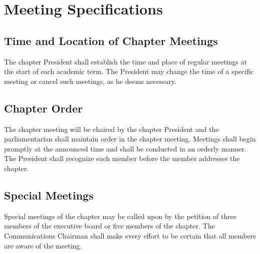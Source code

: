 \chapter{Meeting Specifications}
\label{cha:meeting-specifications}

\section{Time and Location of Chapter Meetings}
\label{sec:time-and-location-of-chapter-meetings}

The chapter President shall establish the time and place of regular meetings at
the start of each academic term.
The President may change the time of a specific
meeting or cancel such meetings, as he deems necessary.

\section{Chapter Order}
\label{sec:chapter-order}

The chapter meeting will be chaired by the chapter President and the
parliamentarian shall maintain order in the chapter meeting.
Meetings shall begin promptly at the announced time and shall be conducted in an
orderly manner.
The President shall recognize each member before the member addresses the
chapter.

\section{Special Meetings}
\label{sec:special-meetings-bylaws}

Special meetings of the chapter may be called upon by the petition of three
members of the executive board or five members of the chapter.
The Communications Chairman shall make every effort to be certain that all
members are aware of the meeting.

